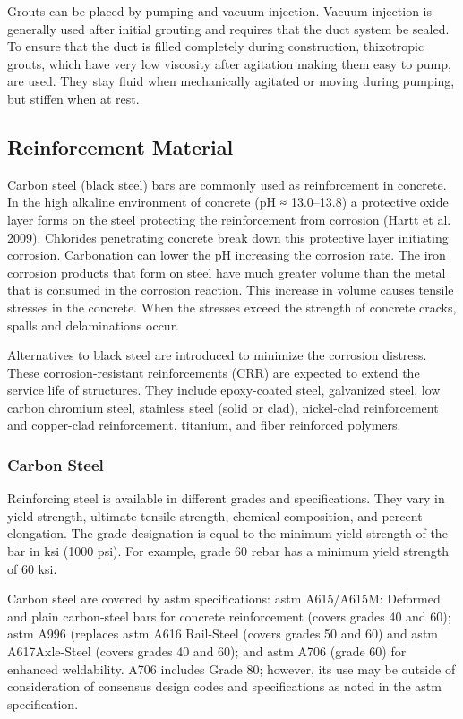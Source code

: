Grouts can be placed by pumping and vacuum injection. Vacuum injection is generally used after initial grouting
and requires that the duct system be sealed. To ensure that the duct is filled completely during construction,
thixotropic grouts, which have very low viscosity after agitation making them easy to pump, are used. They stay fluid
when mechanically agitated or moving during pumping, but stiffen when at rest.


\subsection{Reinforcement Material}
Carbon steel (black steel) bars are commonly used as reinforcement in concrete. In the high alkaline
environment of concrete (pH ≈ 13.0–13.8) a protective oxide layer forms on the steel protecting the reinforcement
from corrosion (Hartt et al. 2009). Chlorides penetrating concrete break down this protective layer initiating
corrosion. Carbonation can lower the pH increasing the corrosion rate. The iron corrosion products that form on steel
have much greater volume than the metal that is consumed in the corrosion reaction. This increase in volume causes
tensile stresses in the concrete. When the stresses exceed the strength of concrete cracks, spalls and delaminations
occur.

Alternatives to black steel are introduced to minimize the corrosion distress. These corrosion-resistant
reinforcements (CRR) are expected to extend the service life of structures. They include epoxy-coated steel,
galvanized steel, low carbon chromium steel, stainless steel (solid or clad), nickel-clad reinforcement and copper-clad
reinforcement, titanium, and fiber reinforced polymers.

\subsubsection{Carbon Steel}
Reinforcing steel is available in different grades and specifications. They vary in yield strength, ultimate tensile
strength, chemical composition, and percent elongation. The grade designation is equal to the minimum yield
strength of the bar in ksi (1000 psi). For example, grade 60 rebar has a minimum yield strength of 60 ksi.

Carbon steel are covered by \acrshort*{astm} specifications: \acrshort*{astm} A615/A615M: Deformed and plain carbon-steel bars
for concrete reinforcement (covers grades 40 and 60); \acrshort*{astm} A996 (replaces \acrshort*{astm} A616 Rail-Steel (covers grades
50 and 60) and \acrshort*{astm} A617Axle-Steel (covers grades 40 and 60); and \acrshort*{astm} A706 (grade 60) for enhanced weldability. A706 includes Grade 80; however, its use may be outside of consideration of consensus design codes
and specifications as noted in the \acrshort*{astm} specification.

